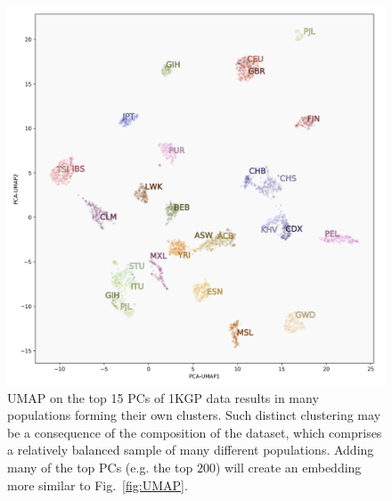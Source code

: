 \documentclass[12pt]{article}
\begin{document}
\begin{figure}
  \includegraphics[width=\linewidth]{code/images/1KGP_PCA_UMAP.png}
  \caption{UMAP on the top 15 PCs of 1KGP data results in many populations forming their own clusters. Such distinct clustering may be a consequence of the composition of the dataset, which comprises a relatively balanced sample of many different populations. Adding many of the top PCs (e.g. the top $200$) will create an embedding more similar to Fig.~\ref{fig:UMAP}. }
  \label{fig:UMAP_fine_scale}
\end{figure}


\newpage
\end{document}
